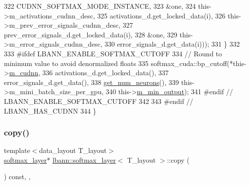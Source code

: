 \begin{DoxyCode}
322                                        CUDNN\_SOFTMAX\_MODE\_INSTANCE,
323                                        &one,
324                                        this->m\_activations\_cudnn\_desc,
325                                        activations\_d.get\_locked\_data(i),
326                                        this->m\_prev\_error\_signals\_cudnn\_desc,
327                                        prev\_error\_signals\_d.get\_locked\_data(i),
328                                        &one,
329                                        this->m\_error\_signals\_cudnn\_desc,
330                                        error\_signals\_d.get\_data(i)));
331     \}
332 
333 \textcolor{preprocessor}{  #ifdef LBANN\_ENABLE\_SOFTMAX\_CUTOFF}
334     \textcolor{comment}{// Round to minimum value to avoid denormalized floats}
335     softmax\_cuda::bp\_cutoff(*this->\hyperlink{classlbann_1_1Layer_a08dbb94239e3b8c96329786c57c72e21}{m\_cudnn},
336                             activations\_d.get\_locked\_data(),
337                             error\_signals\_d.get\_data(),
338                             \hyperlink{classlbann_1_1Layer_aa4de686cc6c2dd38166f42faf874f227}{get\_num\_neurons}(),
339                             this->m\_mini\_batch\_size\_per\_gpu,
340                             this->\hyperlink{classlbann_1_1softmax__layer_ab3bf2d92f4441923dd0b792c38ec774a}{m\_min\_output});
341 \textcolor{preprocessor}{  #endif // LBANN\_ENABLE\_SOFTMAX\_CUTOFF}
342     
343 \textcolor{preprocessor}{  #endif // LBANN\_HAS\_CUDNN}
344   \}
\end{DoxyCode}
\mbox{\label{classlbann_1_1softmax__layer_adbde9ddc7c6cec83645d4bebf8b54113}} 
\subsubsection{\texorpdfstring{copy()}{copy()}}
{\footnotesize\ttfamily template$<$data\+\_\+layout T\+\_\+layout$>$ \\
\hyperlink{classlbann_1_1softmax__layer}{softmax\+\_\+layer}$\ast$ \hyperlink{classlbann_1_1softmax__layer}{lbann\+::softmax\+\_\+layer}$<$ T\+\_\+layout $>$\+::copy (\begin{DoxyParamCaption}{ }\end{DoxyParamCaption}) const\hspace{0.3cm}{\ttfamily [inline]}, {\ttfamily [override]}, {\ttfamily [virtual]}}

